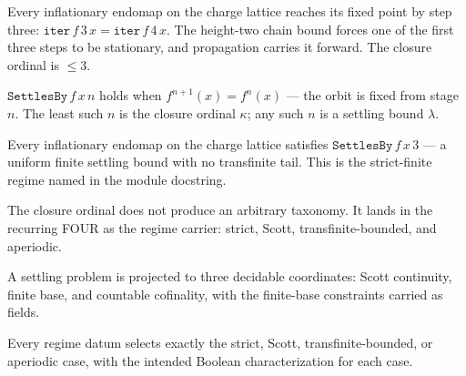 \begin{theorem}[Strict-finite termination: $f^3 = f^4$]\label{thm:settles-by-three}\leanok{}
Every inflationary endomap on the charge lattice reaches its fixed point by step
three: $\texttt{iter}\,f\,3\,x = \texttt{iter}\,f\,4\,x$. The height-two chain
bound forces one of the first three steps to be stationary, and propagation
carries it forward. The closure ordinal is $\le 3$.
\end{theorem}
\begin{proposition}\label{thm:settles-by}\leanok{}
$\texttt{SettlesBy}\,f\,x\,n$ holds when $f^{n+1}(x) = f^n(x)$ --- the orbit is
fixed from stage $n$. The least such $n$ is the closure ordinal $\kappa$; any
such $n$ is a settling bound $\lambda$.
\end{proposition}
\begin{theorem}\label{thm:strict-finite}\leanok{}
Every inflationary endomap on the charge lattice satisfies
$\texttt{SettlesBy}\,f\,x\,3$ --- a uniform finite settling bound with no
transfinite tail. This is the strict-finite regime named in the module
docstring.
\end{theorem}
\begin{proposition}\label{thm:closure-regime-carrier}\leanok{}
The closure ordinal does not produce an arbitrary taxonomy.  It lands in the
recurring FOUR as the regime carrier: strict, Scott, transfinite-bounded, and
aperiodic.
\end{proposition}
\begin{proposition}\label{thm:closure-regime-data}\leanok{}
A settling problem is projected to three decidable coordinates: Scott
continuity, finite base, and countable cofinality, with the finite-base
constraints carried as fields.
\end{proposition}
\begin{theorem}\label{thm:four-regime-dichotomy}\leanok{}
Every regime datum selects exactly the strict, Scott, transfinite-bounded, or
aperiodic case, with the intended Boolean characterization for each case.
\end{theorem}
